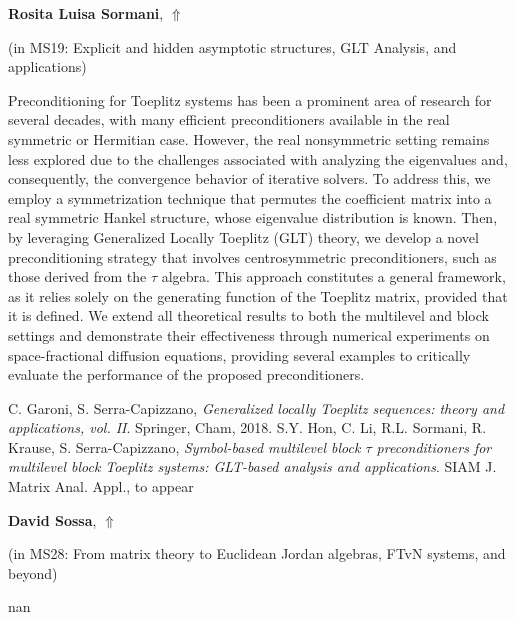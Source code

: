 \documentclass[ILAS2025-program.tex]{subfiles}
\begin{document}
     \hypertarget{down0175}{}\begin{ilasabstract}
    
    \textbf{Rosita Luisa Sormani},  \hfill \hyperlink{up0175}{$\Uparrow$}
    
    (in {\color{mstitle}MS19: Explicit and hidden asymptotic structures, GLT Analysis, and applications})
        
        \mtskip
    \begin{bibunit}
        Preconditioning for Toeplitz systems has been a prominent area of research for several decades, with many efficient preconditioners available in the real symmetric or Hermitian case. However, the real nonsymmetric setting remains less explored due to the challenges associated with analyzing the eigenvalues and, consequently, the convergence behavior of iterative solvers. To address this, we employ a symmetrization technique that permutes the coefficient matrix into a real symmetric Hankel structure, whose eigenvalue distribution is known. Then, by leveraging Generalized Locally Toeplitz (GLT) theory, we develop a novel preconditioning strategy that involves centrosymmetric preconditioners, such as those derived from the $\tau$ algebra. This approach constitutes a general framework, as it relies solely on the generating function of the Toeplitz matrix, provided that it is defined. We extend all theoretical results to both the multilevel and block settings and demonstrate their effectiveness through numerical experiments on space-fractional diffusion equations, providing several examples to critically evaluate the performance of the proposed preconditioners.

\begin{thebibliography}{2}
C. Garoni, S. Serra-Capizzano, \emph{Generalized locally Toeplitz sequences: theory and applications, vol. II}. Springer, Cham, 2018.
S.Y. Hon, C. Li, R.L. Sormani, R. Krause, S. Serra-Capizzano, \emph{Symbol-based multilevel block $\tau$ preconditioners for multilevel block Toeplitz systems: GLT-based analysis and applications}. SIAM J. Matrix Anal. Appl., to appear
\end{thebibliography}

        \end{bibunit}
        \end{ilasabstract}
     \hypertarget{down0386}{}\begin{ilasabstract}
    
    \textbf{David Sossa},  \hfill \hyperlink{up0386}{$\Uparrow$}
    
    (in {\color{mstitle}MS28: From matrix theory to Euclidean Jordan algebras, FTvN systems, and beyond})
        
        \mtskip
    nan\end{ilasabstract}
\end{document}
